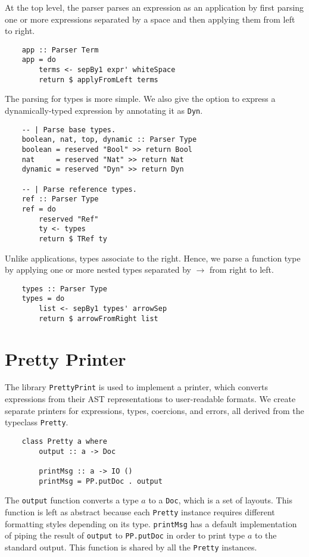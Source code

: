 At the top level, the parser parses an expression as an application by first parsing one or 
more expressions separated by a space and then applying them from left to right.
\begin{lstlisting}
    app :: Parser Term
    app = do
        terms <- sepBy1 expr' whiteSpace 
        return $ applyFromLeft terms
\end{lstlisting}
The parsing for types is more simple. We also give the option to express a dynamically-typed 
expression by annotating it as \lstinline{Dyn}.
\begin{lstlisting}
    -- | Parse base types.
    boolean, nat, top, dynamic :: Parser Type
    boolean = reserved "Bool" >> return Bool
    nat     = reserved "Nat" >> return Nat
    dynamic = reserved "Dyn" >> return Dyn
    
    -- | Parse reference types. 
    ref :: Parser Type 
    ref = do 
        reserved "Ref"
        ty <- types 
        return $ TRef ty
\end{lstlisting}
Unlike applications, types associate to the right. Hence, we parse a function type by applying one 
or more nested types separated by $\rightarrow$ from right to left.
\begin{lstlisting}
    types :: Parser Type
    types = do
        list <- sepBy1 types' arrowSep
        return $ arrowFromRight list
\end{lstlisting}

\section{Pretty Printer}
The library \texttt{PrettyPrint} is used to implement a printer, which converts expressions from their AST representations to 
user-readable formats. We create separate printers for expressions, types, coercions, and errors, all derived from 
the typeclass \lstinline{Pretty}. 
\begin{lstlisting}
    class Pretty a where 
        output :: a -> Doc
        
        printMsg :: a -> IO ()
        printMsg = PP.putDoc . output
\end{lstlisting}
The \lstinline{output} function converts a type $a$ to a 
\texttt{Doc}, which is a set of layouts. This function is left as abstract because each \texttt{Pretty} instance  
requires different formatting styles depending on its type. \texttt{printMsg} has a default implementation of 
piping the result of \texttt{output} to \texttt{PP.putDoc} in order to print type $a$ to the standard output. 
This function is shared by all the \texttt{Pretty} instances. 

